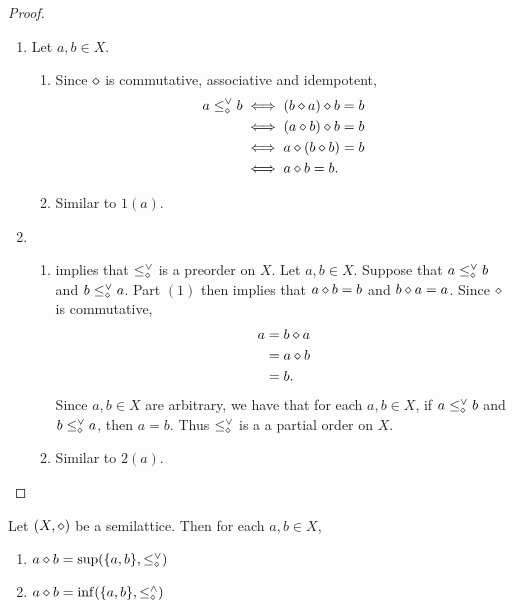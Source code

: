 \documentclass{book}
\begin{document}
	\begin{proof}\
		\begin{enumerate}
			\item Let $a, b \in X$.
			\begin{enumerate}
				\item Since $\diamond$ is commutative, associative and idempotent,
				\begin{align*}
					a \leq^{\vee}_{\diamond} b
					& \iff (b \diamond a) \diamond b = b \\
					& \iff (a \diamond b) \diamond b = b \\
					& \iff a \diamond (b \diamond b) = b \\
					& \iff a \diamond b = b.
				\end{align*}
				\item Similar to $1(a)$.
			\end{enumerate}
			\item 
			\begin{enumerate}
				\item {} implies that $\leq^{\vee}_{\diamond}$ is a preorder on $X$. Let $a,b \in X$. Suppose that $a \leq^{\vee}_{\diamond} b$ and $b \leq^{\vee}_{\diamond} a$. Part $(1)$ then implies that $a \diamond b = b$ and $b \diamond a = a$. Since $\diamond$ is commutative,
				\begin{align*}
					a
					& = b \diamond a \\
					& = a \diamond b \\
					& = b.
				\end{align*}
				Since $a, b \in X$ are arbitrary, we have that for each $a,b \in X$, if $a \leq^{\vee}_{\diamond} b$ and $b \leq^{\vee}_{\diamond} a$, then $a = b$. Thus $\leq^{\vee}_{\diamond}$ is a a partial order on $X$.
				\item Similar to $2(a)$.
			\end{enumerate}
		\end{enumerate}
	\end{proof}
	
	\begin{ex} 
		Let $(X, \diamond)$ be a semilattice. Then for each $a,b \in X$, 
		\begin{enumerate}
			\item $a \diamond b = \sup (\{a, b\}, \leq_{\diamond}^{\vee})$
			\item $a \diamond b = \inf (\{a, b\}, \leq_{\diamond}^{\wedge})$
		\end{enumerate}
	\end{ex}
	
\end{document}
